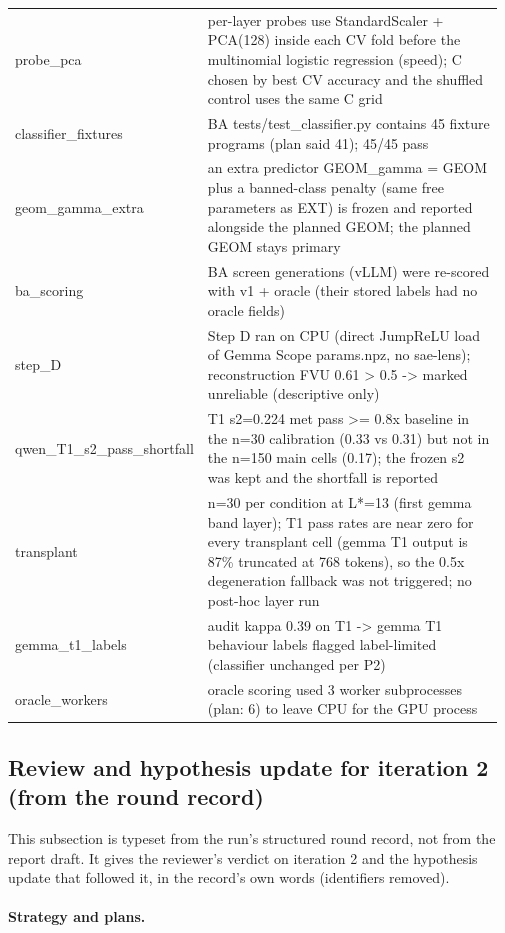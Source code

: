 \documentclass[11pt,letterpaper]{article}
\begin{document}
\begin{longtable}{@{}>{\raggedright\arraybackslash\hspace{0pt}}p{0.2200\linewidth}>{\raggedright\arraybackslash\hspace{0pt}}p{0.7502\linewidth}@{}}
probe\_pca & per-layer probes use StandardScaler + PCA(128) inside each CV fold before the multinomial logistic regression (speed); C chosen by best CV accuracy and the shuffled control uses the same C grid \\
classifier\_fixtures & BA tests/test\_classifier.py contains 45 fixture programs (plan said 41); 45/45 pass \\
geom\_gamma\_extra & an extra predictor GEOM\_gamma = GEOM plus a banned-class penalty (same free parameters as EXT) is frozen and reported alongside the planned GEOM; the planned GEOM stays primary \\
ba\_scoring & BA screen generations (vLLM) were re-scored with v1 + oracle (their stored labels had no oracle fields) \\
step\_D & Step D ran on CPU (direct JumpReLU load of Gemma Scope params.npz, no sae-lens); reconstruction FVU 0.61 \textgreater{} 0.5 -\textgreater{} marked unreliable (descriptive only) \\
qwen\_T1\_s2\_pass\_shortfall & T1 s2=0.224 met pass \textgreater{}= 0.8x baseline in the n=30 calibration (0.33 vs 0.31) but not in the n=150 main cells (0.17); the frozen s2 was kept and the shortfall is reported \\
transplant & n=30 per condition at L*=13 (first gemma band layer); T1 pass rates are near zero for every transplant cell (gemma T1 output is 87\% truncated at 768 tokens), so the 0.5x degeneration fallback was not triggered; no post-hoc layer run \\
gemma\_t1\_labels & audit kappa 0.39 on T1 -\textgreater{} gemma T1 behaviour labels flagged label-limited (classifier unchanged per P2) \\
oracle\_workers & oracle scoring used 3 worker subprocesses (plan: 6) to leave CPU for the GPU process \\
\end{longtable}\endgroup

\subsection{Review and hypothesis update for iteration 2 (from the round record)}\label{sec:rec2}

This subsection is typeset from the run's structured round record, not from the report draft. It gives the reviewer's verdict on iteration 2 and the hypothesis update that followed it, in the record's own words (identifiers removed).

\paragraph{Strategy and plans.}
\end{document}
